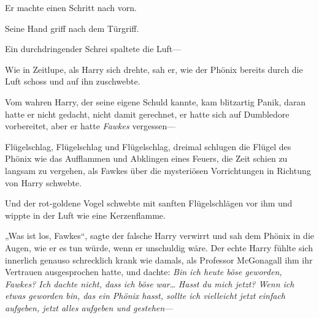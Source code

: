 Er machte einen Schritt nach vorn.

Seine Hand griff nach dem Türgriff.

Ein durchdringender Schrei spaltete die Luft—

Wie in Zeitlupe, als Harry sich drehte, sah er, wie der Phönix bereits durch die Luft schoss und auf ihn zuschwebte.

Vom wahren Harry, der seine eigene Schuld kannte, kam blitzartig Panik, daran hatte er nicht gedacht, nicht damit gerechnet, er hatte sich auf Dumbledore vorbereitet, aber er hatte \emph{Fawkes} vergessen—

Flügelschlag, Flügelschlag und Flügelschlag, dreimal schlugen die Flügel des Phönix wie das Aufflammen und Abklingen eines Feuers, die Zeit schien zu langsam zu vergehen, als Fawkes über die mysteriösen Vorrichtungen in Richtung von Harry schwebte.

Und der rot-goldene Vogel schwebte mit sanften Flügelschlägen vor ihm und wippte in der Luft wie eine Kerzenflamme.

„Was ist los, Fawkes“, sagte der falsche Harry verwirrt und sah dem Phönix in die Augen, wie er es tun würde, wenn er unschuldig wäre. Der echte Harry fühlte sich innerlich genauso schrecklich krank wie damals, als Professor McGonagall ihm ihr Vertrauen ausgesprochen hatte, und dachte: \emph{Bin ich heute böse geworden, Fawkes? Ich dachte nicht, dass ich böse} \emph{war}… \emph{Hasst du mich jetzt? Wenn ich etwas geworden bin, das ein Phönix hasst, sollte ich vielleicht jetzt einfach aufgeben, jetzt alles aufgeben und gestehen}—

